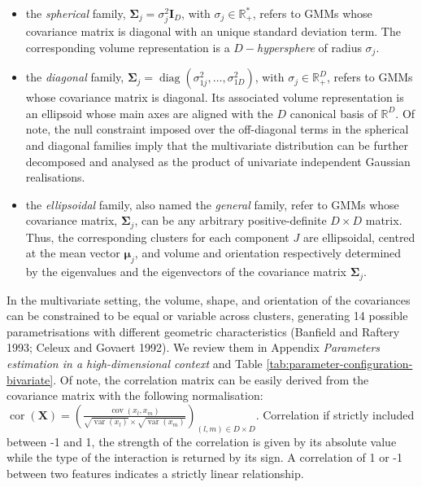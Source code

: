 \begin{itemize}
\tightlist
\item
  the \emph{spherical} family, \(\boldsymbol{\Sigma}_j=\sigma_j^2 \boldsymbol{I}_D\), with \(\sigma_j \in \mathbb{R}_{+}^*\), refers to GMMs whose covariance matrix is diagonal with an unique standard deviation term. The corresponding volume representation is a \(D-\)\emph{hypersphere} of radius \(\sigma_j\).
\item
  the \emph{diagonal} family, \(\boldsymbol{\Sigma}_j=\operatorname{diag} \left(\sigma_{1j}^2, \ldots, \sigma_{1D}^2\right)\), with \(\sigma_j \in \mathbb{R}_{+}^D\), refers to GMMs whose covariance matrix is diagonal. Its associated volume representation is an ellipsoid whose main axes are aligned with the \(D\) canonical basis of \(\mathbb{R}^D\). Of note, the null constraint imposed over the off-diagonal terms in the spherical and diagonal families imply that the multivariate distribution can be further decomposed and analysed as the product of univariate independent Gaussian realisations.
\item
  the \emph{ellipsoidal} family, also named the \emph{general} family, refer to GMMs whose covariance matrix, \(\boldsymbol{\Sigma}_j\), can be any arbitrary positive-definite \(D \times D\) matrix. Thus, the corresponding clusters for each component \(J\) are ellipsoidal, centred at the mean vector \(\boldsymbol{\mu}_j\), and volume and orientation respectively determined by the eigenvalues and the eigenvectors of the covariance matrix \(\boldsymbol{\Sigma}_j\).
\end{itemize}

In the multivariate setting, the volume, shape, and orientation of the covariances can be constrained to be equal or variable across clusters, generating 14 possible parametrisations with different geometric characteristics (Banfield and Raftery 1993; Celeux and Govaert 1992). We review them in Appendix \emph{Parameters estimation in a high-dimensional context} and Table \ref{tab:parameter-configuration-bivariate}. Of note, the
correlation matrix can be easily derived from the covariance
matrix with the following normalisation:
\(\operatorname{cor}(\boldsymbol{X})=\left(\frac{\operatorname{cov}(x_l, x_m)}{\sqrt{\operatorname{var}(x_l)} \times \sqrt{\operatorname{var}(x_m)}}\right)_{(l,m) \in D \times D}\). Correlation if strictly included between -1 and 1, the strength of the
correlation is given by its absolute value while the type of the
interaction is returned by its sign. A correlation of 1 or -1 between two features indicates a strictly linear relationship.

